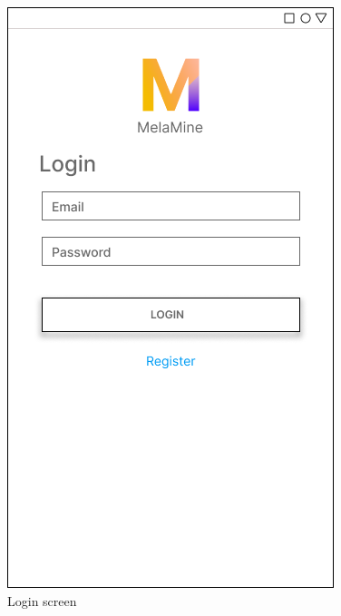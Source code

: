 \documentclass[12pt, a4paper]{article}
\begin{document}
\begin{figure}[h]
    \centering
    \setlength{\fboxsep}{8pt}
    \includegraphics[scale=0.45, fbox]{Login.png}
    \caption{Login screen}
    \label{fig:login}
\end{figure}
\end{document}
